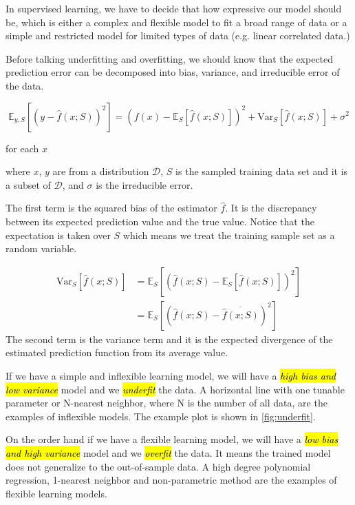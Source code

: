 \documentclass{kthreport}
\begin{document}
In supervised learning, we have to decide that how expressive our model should be,
which is either a complex and flexible model to fit a broad range of data or
a simple and restricted model for limited types of data (e.g. linear correlated data.)

Before talking underfitting and overfitting, we should know that the expected prediction error
can be decomposed into bias, variance, and irreducible error of the data.

\begin{equation}
    \mathbb{E}_{y,S}[(y-\hat{f}(x; S))^2] =
    (f(x) - \mathbb{E}_{S}[\hat{f}(x; S)])^2
    + \mathrm{Var}_{S}[\hat{f}(x; S)]
    + \sigma^2
\end{equation}

for each $x$

where $x$, $y$ are from a distribution $\mathcal{D}$, $S$ is the sampled training
data set and it is a subset of $\mathcal{D}$, and $\sigma$ is the irreducible error.

The first term is the squared bias of the estimator $\hat{f}$.
It is the discrepancy between its expected prediction value and the true value.
Notice that the expectation is taken over $S$ which means we treat the training sample
set as a random variable.

\begin{align}
    \mathrm{Var}_{S}[\hat{f}(x; S)]
    &= \mathbb{E}_{S}[(\hat{f}(x; S) - \mathbb{E}_{S}[\hat{f}(x; S)])^2] \\
    &= \mathbb{E}_{S}[(\hat{f}(x; S) - \overline{\hat{f}(x; S)})^2]
\end{align}
The second term is the variance term and it is
the expected divergence of the estimated prediction function from its average value.


If we have a simple and inflexible learning model, we will have
a \emph{\hl{high bias and low variance}} model and we \emph{\hl{underfit}} the data.
A horizontal line with one tunable parameter or N-nearest neighbor, where N is
the number of all data, are the examples of inflexible models.
The example plot is shown in \cref{fig:underfit}.

On the order hand if we have a flexible learning model,
we will have a \emph{\hl{low bias and high variance}} model and we \emph{\hl{overfit}} the data.
It means the trained model does not generalize to the out-of-sample data. A high
degree polynomial regression, 1-nearest neighbor and non-parametric method are the
examples of flexible learning models.
\end{document}
